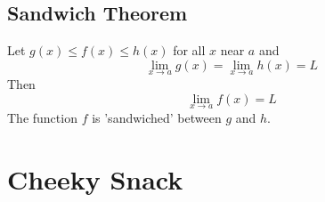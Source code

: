 \documentclass[a4paper,twoside]{article}
\begin{document}
		\subsection{Sandwich Theorem}
			Let $g(x)\leq f(x)\leq h(x)$ for all $x$ near $a$ and
			\[
				\lim_{x\to a}g(x)=\lim_{x\to a}h(x)=L
			\]
			Then
			\[
				\lim_{x\to a}f(x)=L
			\]
			The function $f$ is 'sandwiched' between $g$ and $h$.
	\newpage
	\section{Cheeky Snack}
\end{document}
